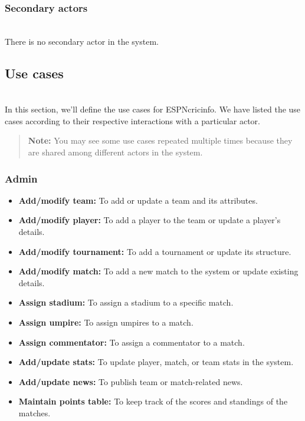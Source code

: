 \subsubsection{Secondary actors}\label{lEcNC8WML8gerPdLMHJRE}
\\
There is no secondary actor in the system.

\subsection{Use cases}\label{gWjPgqzXlAQUpyZh5raCb}
\\
In this section, we'll define the use cases for ESPNcricinfo. We have listed the use cases according to their respective interactions with a particular actor.
\begin{quote}
\textbf{Note:} You may see some use cases repeated multiple times because they are shared among different actors in the system.
\end{quote}
\subsubsection{Admin}\label{eZpS0muFQwUehMM5WsagE}

\begin{itemize}
\item
\protect{}\label{KW05Iujb2XrJ6--uuloP_}
\textbf{Add/modify team:} To add or update a team and its attributes.
\item
\protect{}\label{xwM4nsS3-JAwvL8Y1USlL}
\textbf{Add/modify player:} To add a player to the team or update a player's details.
\item
\protect{}\label{Sy0AtnapSY_a5zMELAULY}
\textbf{Add/modify tournament:} To add a tournament or update its structure.
\item
\protect{}\label{DY_7RYjh92fmWLSd9AoMR}
\textbf{Add/modify match:} To add a new match to the system or update existing details.
\item
\protect{}\label{oszPnpxG4LqL0kAvOCf3d}
\textbf{Assign stadium:} To assign a stadium to a specific match.
\item
\protect{}\label{m9ocfhR9l5-sKnTFtDuSy}
\textbf{Assign umpire:} To assign umpires to a match.
\item
\protect{}\label{V4XasAkLtb6obQzZvAUKi}
\textbf{Assign commentator:} To assign a commentator to a match.
\item
\protect{}\label{Xovcz_k2ipQYNg-719yGE}
\textbf{Add/update stats:} To update player, match, or team stats in the system.
\item
\protect{}\label{D-B7wcWEuLJzQrOP-S3WZ}
\textbf{Add/update news:} To publish team or match-related news.
\item
\protect{}\label{D-B7wcWEuLJzQrOP-S3WZ}
\textbf{Maintain points table:} To keep track of the scores and standings of the matches.
\end{itemize}

